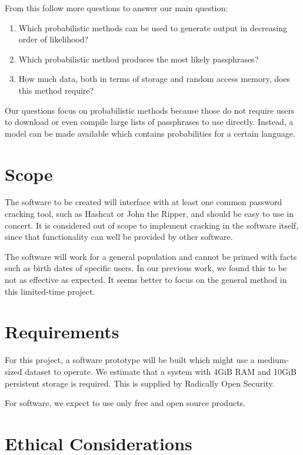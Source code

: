 \documentclass{article}
\begin{document}
From this follow more questions to answer our main question:

\begin{enumerate}
	\item Which probabilistic methods can be used to generate output in decreasing order of likelihood?
	\item Which probabilistic method produces the most likely passphrases?
	\item How much data, both in terms of storage and random access memory, does this method require?
\end{enumerate}

Our questions focus on probabilistic methods because those do not require users
to download or even compile large lists of passphrases to use directly.
Instead, a model can be made available which contains probabilities for a
certain language.


\section{Scope}

The software to be created will interface with at least one common password
cracking tool, such as Hashcat or John the Ripper, and should be easy to use in
concert. It is considered out of scope to implement cracking in the software
itself, since that functionality can well be provided by other software.

The software will work for a general population and cannot be primed with facts
such as birth dates of specific users. In our previous work\cite{own}, we found
this to be not as effective as expected. It seems better to focus on the
general method in this limited-time project.


\section{Requirements}

For this project, a software prototype will be built which might use a
medium-sized dataset to operate. We estimate that a system with 4GiB RAM and
10GiB persistent storage is required. This is supplied by Radically Open
Security.

For software, we expect to use only free and open source products.


\section{Ethical Considerations}
\end{document}
